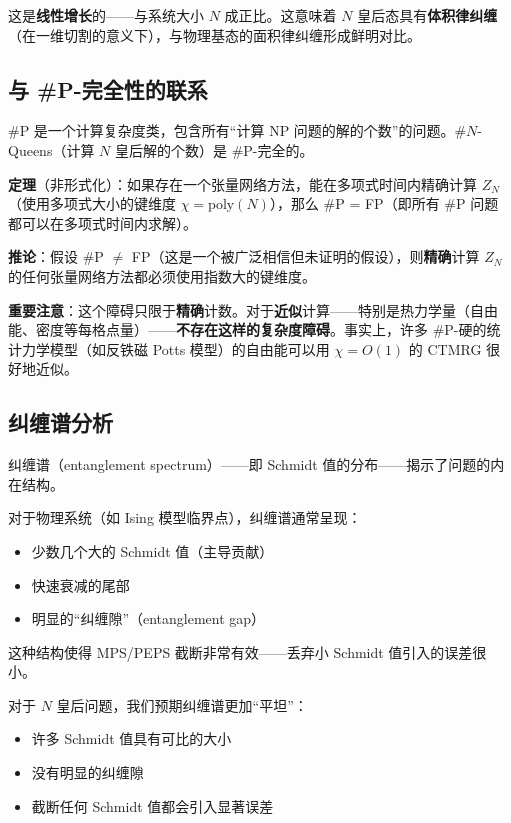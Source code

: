 \documentclass[12pt,a4paper]{ctexart}
\begin{document}
这是\textbf{线性增长}的——与系统大小 $N$ 成正比。这意味着 $N$ 皇后态具有\textbf{体积律纠缠}（在一维切割的意义下），与物理基态的面积律纠缠形成鲜明对比。

\subsection{与 \#P-完全性的联系}

\#P 是一个计算复杂度类，包含所有``计算 NP 问题的解的个数''的问题。$\#N$-Queens（计算 $N$ 皇后解的个数）是 \#P-完全的。

\begin{tcolorbox}[title=\#P-完全性与张量网络, colback=red!5, colframe=red!60!black]
\textbf{定理}（非形式化）：如果存在一个张量网络方法，能在多项式时间内精确计算 $Z_N$（使用多项式大小的键维度 $\chi = \text{poly}(N)$），那么 \#P = FP（即所有 \#P 问题都可以在多项式时间内求解）。

\textbf{推论}：假设 \#P $\neq$ FP（这是一个被广泛相信但未证明的假设），则\textbf{精确}计算 $Z_N$ 的任何张量网络方法都必须使用指数大的键维度。

\textbf{重要注意}：这个障碍只限于\textbf{精确}计数。对于\textbf{近似}计算——特别是热力学量（自由能、密度等每格点量）——\textbf{不存在这样的复杂度障碍}。事实上，许多 \#P-硬的统计力学模型（如反铁磁 Potts 模型）的自由能可以用 $\chi = O(1)$ 的 CTMRG 很好地近似。
\end{tcolorbox}

\subsection{纠缠谱分析}

纠缠谱（entanglement spectrum）——即 Schmidt 值的分布——揭示了问题的内在结构。

对于物理系统（如 Ising 模型临界点），纠缠谱通常呈现：
\begin{itemize}
\item 少数几个大的 Schmidt 值（主导贡献）
\item 快速衰减的尾部
\item 明显的``纠缠隙''（entanglement gap）
\end{itemize}
这种结构使得 MPS/PEPS 截断非常有效——丢弃小 Schmidt 值引入的误差很小。

对于 $N$ 皇后问题，我们预期纠缠谱更加``平坦''：
\begin{itemize}
\item 许多 Schmidt 值具有可比的大小
\item 没有明显的纠缠隙
\item 截断任何 Schmidt 值都会引入显著误差
\end{itemize}
\end{document}
